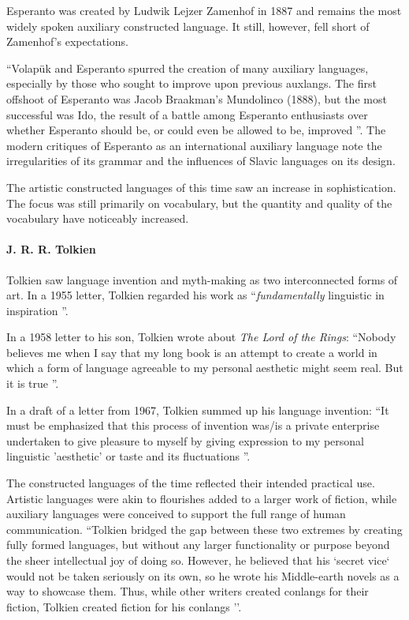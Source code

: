 \documentclass[14pt, a4paper]{extreport}
\begin{document}
Esperanto was created by Ludwik Lejzer Zamenhof in 1887 and remains the most widely spoken auxiliary constructed language. It still, however, fell short of Zamenhof's expectations.

``Volapük and Esperanto spurred the creation of many auxiliary languages, especially by those who sought to improve upon previous auxlangs. The first offshoot of Esperanto was Jacob Braakman's Mundolinco (1888), but the most successful was Ido, the result of a battle among Esperanto enthusiasts over whether Esperanto should be, or could even be allowed to be, improved \parencite{sanders}''. The modern critiques of Esperanto as an international auxiliary language note the irregularities of its grammar and the influences of Slavic languages on its design.

The artistic constructed languages of this time saw an increase in sophistication. The focus was still primarily on vocabulary, but the quantity and quality of the vocabulary have noticeably increased.
        \paragraph{J. R. R. Tolkien}
Tolkien saw language invention and myth-making as two interconnected forms of art. In a 1955 letter, Tolkien regarded his work as ``\textit{fundamentally} linguistic in inspiration \parencite[233]{letters}''.

In a 1958 letter to his son, Tolkien wrote about \textit{The Lord of the Rings}: ``Nobody believes me when I say that my long book is an attempt to create a world in which a form of language agreeable to my personal aesthetic might seem real. But it is true \parencite[285]{letters}''.

In a draft of a letter from 1967, Tolkien summed up his language invention: ``It must be emphasized that this process of invention was/is a private enterprise undertaken to give pleasure to myself by giving expression to my personal linguistic 'aesthetic' or taste and its fluctuations \parencite[411]{letters}''.

The constructed languages of the time reflected their intended practical use. Artistic languages were akin to flourishes added to a larger work of fiction, while auxiliary languages were conceived to support the full range of human communication. ``Tolkien bridged the gap between these two extremes by creating fully formed languages, but without any larger functionality or purpose beyond the sheer intellectual joy of doing so. However, he believed that his `secret vice` would not be taken seriously on its own, so he wrote his Middle-earth novels as a way to showcase them. Thus, while other writers created conlangs for their fiction, Tolkien created fiction for his conlangs \parencite{sanders}''.
\end{document}
